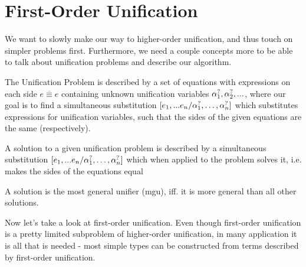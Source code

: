 \documentclass[twoside,12pt,a4paper]{article}
\begin{document}
\begin{prooftree}
\end{prooftree}
\begin{prooftree}
\end{prooftree}    


\section{First-Order Unification}

We want to slowly make our way to higher-order unification, and thus touch on simpler problems first. 
Furthermore, we need a couple concepts more to be able to talk about unification problems and describe our algorithm. 

The Unification Problem is described by a set of equations with expressions on each side $\overline{e\equiv e}$ containing unknown unification variables $\alphaunifvar_1, \alphaunifvar_2, ...$, %
where our goal is to find a simultaneous substitution $[\listofexpr / \alphaunifvar_1, \dots, \alphaunifvar_n]$ which substitutes expressions for unification variables, 
such that the sides of the given equations are the same (respectively). 

\begin{definition}[Solution]
    A solution to a given unification problem is described by a simultaneous substitution $[\listofexpr / \alphaunifvar_1, \dots, \alphaunifvar_n]$
    which when applied to the problem solves it, i.e. makes the sides of the equations equal %
\end{definition}
    
\begin{definition}
    A solution is the most general unifier (mgu), iff. it is more general than all other solutions.
\end{definition} 

Now let's take a look at first-order unification.
Even though first-order unification is a pretty limited subproblem of higher-order unification, 
in many application it is all that is needed - most simple types can be constructed from terms described by first-order unification. 
\end{document}
